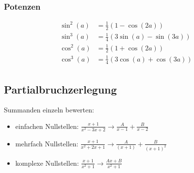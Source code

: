 \subsubsection{Potenzen}
\begin{align*}
	\sin^2(a) &= \frac{1}{2}(1 - \cos(2a)) \\
	\sin^3(a) &= \frac{1}{4}(3\sin(a) - \sin(3a)) \\
	\cos^2(a) &= \frac{1}{2}(1 + \cos(2a)) \\
	\cos^3(a) &= \frac{1}{4}(3\cos(a) + \cos(3a)) \\
\end{align*}

\subsection{Partialbruchzerlegung}
Summanden einzeln bewerten:
\begin{itemize}[nosep]
	\item einfachen Nullstellen: $\frac{x+1}{x^2 - 3x +2} \rightarrow \frac{A}{x-1} + \frac{B}{x-2}$
	\item mehrfach Nullstellen: $\frac{x+1}{x^2 + 2x +1} \rightarrow \frac{A}{(x+1)}+\frac{B}{(x+1)^2}$
	\item komplexe Nullstellen: $\frac{x+1}{x^2 + 1} \rightarrow \frac{Ax + B}{x^2 + 1}$
\end{itemize}
